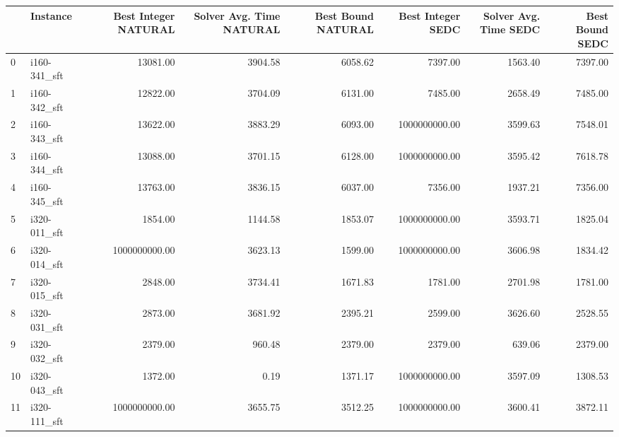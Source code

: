 \begin{tabular}{llrrrrrr}
\toprule
{} &      Instance &  Best Integer NATURAL &  Solver Avg. Time NATURAL &  Best Bound NATURAL &  Best Integer SEDC &  Solver Avg. Time SEDC &  Best Bound SEDC \\
\midrule
0  &  i160-341\_sft &              13081.00 &                   3904.58 &             6058.62 &            7397.00 &                1563.40 &          7397.00 \\
1  &  i160-342\_sft &              12822.00 &                   3704.09 &             6131.00 &            7485.00 &                2658.49 &          7485.00 \\
2  &  i160-343\_sft &              13622.00 &                   3883.29 &             6093.00 &      1000000000.00 &                3599.63 &          7548.01 \\
3  &  i160-344\_sft &              13088.00 &                   3701.15 &             6128.00 &      1000000000.00 &                3595.42 &          7618.78 \\
4  &  i160-345\_sft &              13763.00 &                   3836.15 &             6037.00 &            7356.00 &                1937.21 &          7356.00 \\
5  &  i320-011\_sft &               1854.00 &                   1144.58 &             1853.07 &      1000000000.00 &                3593.71 &          1825.04 \\
6  &  i320-014\_sft &         1000000000.00 &                   3623.13 &             1599.00 &      1000000000.00 &                3606.98 &          1834.42 \\
7  &  i320-015\_sft &               2848.00 &                   3734.41 &             1671.83 &            1781.00 &                2701.98 &          1781.00 \\
8  &  i320-031\_sft &               2873.00 &                   3681.92 &             2395.21 &            2599.00 &                3626.60 &          2528.55 \\
9  &  i320-032\_sft &               2379.00 &                    960.48 &             2379.00 &            2379.00 &                 639.06 &          2379.00 \\
10 &  i320-043\_sft &               1372.00 &                      0.19 &             1371.17 &      1000000000.00 &                3597.09 &          1308.53 \\
11 &  i320-111\_sft &         1000000000.00 &                   3655.75 &             3512.25 &      1000000000.00 &                3600.41 &          3872.11 \\

\end{tabular}
